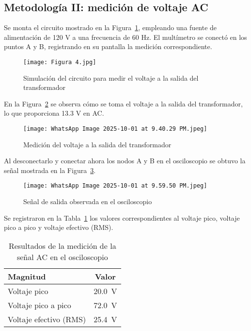 \documentclass[conference]{IEEEtran} %
\begin{document}
\subsection{Metodología II: medición de voltaje AC}
Se monta el circuito mostrado en la Figura~\ref{fig:simulacion-transformador}, empleando una fuente de alimentación de 120 V a una frecuencia de 60 Hz. El multímetro se conectó en los puntos A y B, registrando en su pantalla la medición correspondiente.
\begin{figure}[htbp]
    \centering
    \texttt{[image: Figura 4.jpg]}
    \caption{Simulación del circuito para medir el voltaje a la salida del transformador}
    \label{fig:simulacion-transformador}
\end{figure}
En la Figura~\ref{fig:medicion-transformador} se observa cómo se toma el voltaje a la salida del transformador, lo que proporciona 13.3 V en AC.
\begin{figure}[htbp]
    \centering
    \texttt{[image: WhatsApp Image 2025-10-01 at 9.40.29 PM.jpeg]}
    \caption{Medición del voltaje a la salida del transformador}
    \label{fig:medicion-transformador}
\end{figure}
Al desconectarlo y conectar ahora los nodos A y B en el osciloscopio se obtuvo la señal mostrada en la Figura~\ref{fig:senal-ac-osciloscopio}.
\begin{figure}[htbp]
    \centering
    \texttt{[image: WhatsApp Image 2025-10-01 at 9.59.50 PM.jpeg]}
    \caption{Señal de salida observada en el osciloscopio}
    \label{fig:senal-ac-osciloscopio}
\end{figure}
Se registraron en la Tabla~\ref{tab:resultados-ac} los valores correspondientes al voltaje pico, voltaje pico a pico y voltaje efectivo (RMS).
\begin{table}[htbp]
    \centering
    \caption{Resultados de la medición de la señal AC en el osciloscopio}
    \label{tab:resultados-ac}
    \begin{tabular}{@{}lc@{}}
        \toprule
        Magnitud & Valor \\ \midrule
        Voltaje pico & \SI{20.0}{\volt} \\
        Voltaje pico a pico & \SI{72.0}{\volt} \\
        Voltaje efectivo (RMS) & \SI{25.4}{\volt} \\
        \bottomrule
    \end{tabular}
\end{table}
\end{document}
